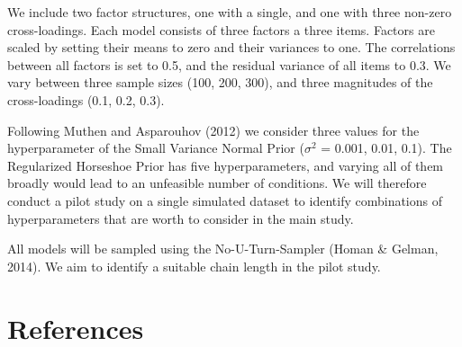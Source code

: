 \documentclass[
  man]{apa6}
\begin{document}
We include two factor structures, one with a single, and one with three non-zero cross-loadings. Each model consists of three factors a three items. Factors are scaled by setting their means to zero and their variances to one. The correlations between all factors is set to 0.5, and the residual variance of all items to 0.3. We vary between three sample sizes (100, 200, 300), and three magnitudes of the cross-loadings (0.1, 0.2, 0.3).

Following Muthen and Asparouhov (2012) we consider three values for the hyperparameter of the Small Variance Normal Prior (\(\sigma^2\) = 0.001, 0.01, 0.1). The Regularized Horseshoe Prior has five hyperparameters, and varying all of them broadly would lead to an unfeasible number of conditions. We will therefore conduct a pilot study on a single simulated dataset to identify combinations of hyperparameters that are worth to consider in the main study.

All models will be sampled using the No-U-Turn-Sampler (Homan \& Gelman, 2014). We aim to identify a suitable chain length in the pilot study.

\clearpage

\hypertarget{references}{%
\section{References}\label{references}}

~

\begingroup
\setlength{\parindent}{-0.5in}
\setlength{\leftskip}{0.5in}
\end{document}
